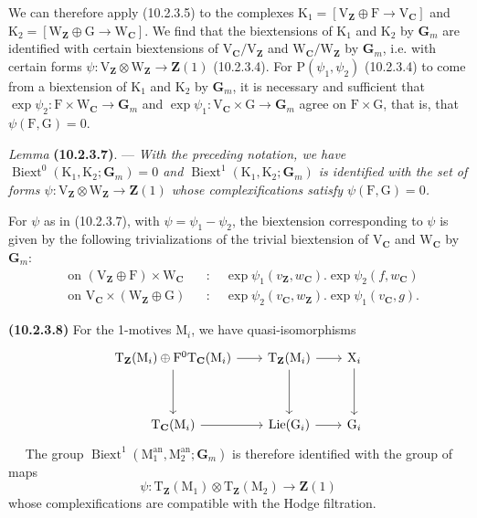 \documentclass[11pt,leqno]{article}
\newcommand{\Page}[1]{\ifvmode\noindent\else\unskip\ \fi{\footnotesize\textcolor{gray}{[p.\,#1]}}\ \ignorespaces}
\begin{document}
We can therefore apply (10.2.3.5) to the complexes
\(\mathrm{K}_1=[\mathrm{V}_{\mathbf{Z}}\oplus\mathrm{F}
\to\mathrm{V}_{\mathbf{C}}]\) and
\(\mathrm{K}_2=[\mathrm{W}_{\mathbf{Z}}\oplus\mathrm{G}
\to\mathrm{W}_{\mathbf{C}}]\).
We find that the biextensions of \(\mathrm{K}_1\) and
\(\mathrm{K}_2\) by \(\mathbf{G}_m\) are identified with certain
biextensions of
\(\mathrm{V}_{\mathbf{C}}/\mathrm{V}_{\mathbf{Z}}\) and
\(\mathrm{W}_{\mathbf{C}}/\mathrm{W}_{\mathbf{Z}}\) by
\(\mathbf{G}_m\), i.e. with certain forms
\(\psi:\mathrm{V}_{\mathbf{Z}}\otimes\mathrm{W}_{\mathbf{Z}}
\to\mathbf{Z}(1)\) (10.2.3.4).
For \(\mathrm{P}(\psi_1,\psi_2)\) (10.2.3.4) to come from a
biextension of \(\mathrm{K}_1\) and \(\mathrm{K}_2\) by
\(\mathbf{G}_m\), it is necessary and sufficient that
\(\exp\psi_2:\mathrm{F}\times\mathrm{W}_{\mathbf{C}}\to\mathbf{G}_m\)
and
\(\exp\psi_1:\mathrm{V}_{\mathbf{C}}\times\mathrm{G}\to\mathbf{G}_m\)
agree on \(\mathrm{F}\times\mathrm{G}\), that is, that
\(\psi(\mathrm{F},\mathrm{G})=0\).

\textit{Lemma} \textbf{(10.2.3.7)}. — \textit{With the preceding
notation, we have
\(\operatorname{Biext}^{0}(\mathrm{K}_1,\mathrm{K}_2;\mathbf{G}_m)=0\)
and
\(\operatorname{Biext}^{1}(\mathrm{K}_1,\mathrm{K}_2;\mathbf{G}_m)\)
is identified with the set of forms
\(\psi:\mathrm{V}_{\mathbf{Z}}\otimes\mathrm{W}_{\mathbf{Z}}
\to\mathbf{Z}(1)\) whose complexifications satisfy
\(\psi(\mathrm{F},\mathrm{G})=0\).}

For \(\psi\) as in (10.2.3.7), with \(\psi=\psi_1-\psi_2\),
the biextension corresponding to \(\psi\) is given by the
following trivializations of the trivial biextension of
\(\mathrm{V}_{\mathbf{C}}\) and \(\mathrm{W}_{\mathbf{C}}\) by
\(\mathbf{G}_m\):
\[
\begin{aligned}
&\text{on }(\mathrm{V}_{\mathbf{Z}}\oplus\mathrm{F})
\times\mathrm{W}_{\mathbf{C}}
&&:\quad \exp\psi_1(v_{\mathbf{Z}},w_{\mathbf{C}})
.\exp\psi_2(f,w_{\mathbf{C}})\\
&\text{on }\mathrm{V}_{\mathbf{C}}\times
(\mathrm{W}_{\mathbf{Z}}\oplus\mathrm{G})
&&:\quad \exp\psi_2(v_{\mathbf{C}},w_{\mathbf{Z}})
.\exp\psi_1(v_{\mathbf{C}},g).
\end{aligned}
\]

\textbf{(10.2.3.8)} For the 1-motives \(\mathrm{M}_i\), we have
quasi-isomorphisms
\[
\begin{tikzcd}[row sep=3.5em, column sep=2em]
\mathrm{T}_{\mathbf{Z}}(\mathrm{M}_i)\oplus
\mathrm{F}^{0}\mathrm{T}_{\mathbf{C}}(\mathrm{M}_i)
  \arrow[r] \arrow[d]
&
\mathrm{T}_{\mathbf{Z}}(\mathrm{M}_i)
  \arrow[r] \arrow[d]
&
\mathrm{X}_i \arrow[d]
\\
\mathrm{T}_{\mathbf{C}}(\mathrm{M}_i) \arrow[r]
&
\operatorname{Lie}(\mathrm{G}_i) \arrow[r]
&
\mathrm{G}_i
\end{tikzcd}
\]
\Page{63}
The group
\(\operatorname{Biext}^{1}(\mathrm{M}_1^{\mathrm{an}},
\mathrm{M}_2^{\mathrm{an}};\mathbf{G}_m)\)
is therefore identified with the group of maps
\[
\psi:\mathrm{T}_{\mathbf{Z}}(\mathrm{M}_1)\otimes
\mathrm{T}_{\mathbf{Z}}(\mathrm{M}_2)\to\mathbf{Z}(1)
\]
whose complexifications are compatible with the Hodge filtration.
\end{document}
